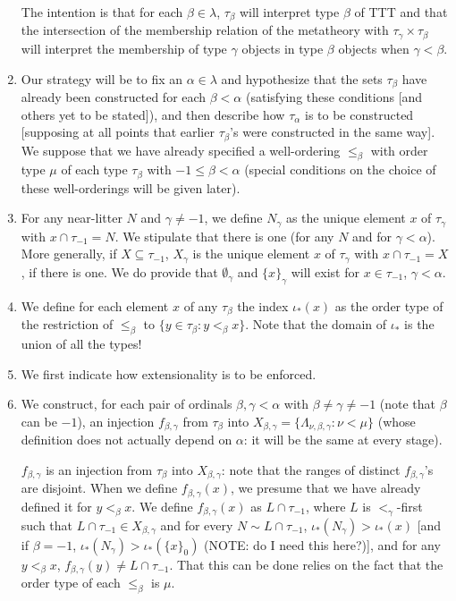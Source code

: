 \documentclass[12pt]{article}
\begin{document}
\begin{enumerate}
The intention is that for each $\beta \in \lambda$, $\tau_\beta$ will interpret type $\beta$ of TTT and that the intersection of the membership relation of the metatheory with $\tau_\gamma \times \tau_\beta$ will interpret the membership of type $\gamma$ objects in type $\beta$ objects when $\gamma<\beta$.

\item Our strategy will be to fix an $\alpha\in \lambda$ and hypothesize that the sets $\tau_\beta$ have already been constructed for each $\beta<\alpha$ (satisfying these conditions [and others yet to be stated]), and then describe how $\tau_\alpha$ is to be constructed [supposing at all points that earlier $\tau_\beta$'s were constructed in the same way].   We suppose that we have already specified
a well-ordering $\leq_\beta$ with order type $\mu$ of each type $\tau_\beta$ with $-1\leq \beta <\alpha$ (special conditions on the choice of these well-orderings will be given later).   

\item For any near-litter $N$ and $\gamma\neq -1$, we define $N_\gamma$ as the unique element $x$  of $\tau_\gamma$ with $x \cap \tau_{-1} = N$.  We stipulate that there is one (for any $N$ and for $\gamma<\alpha$).  More generally, if
$X \subseteq \tau_{-1}$, $X_\gamma$ is the unique element $x$ of $\tau_\gamma$ with $x \cap \tau_{-1} = X$, if there is one.  We do provide that $\emptyset_\gamma$ and $\{x\}_\gamma$ will exist
for $x \in \tau_{-1}$, $\gamma<\alpha$.

\item We define for each element $x$ of any $\tau_\beta$ the index $\iota_*(x)$
as the order type of the restriction of $\leq_\beta$ to $\{y \in \tau_\beta:y <_\beta x\}$.  Note that the domain of $\iota_*$ is the union of all the types!

\item We first indicate how extensionality is to be enforced.  

\item We construct, for each pair of ordinals $\beta,\gamma<\alpha$ with $\beta \neq \gamma\neq -1$ (note that $\beta$ can be $-1$),  an injection $f_{\beta,\gamma}$ from $\tau_\beta$ into $X_{\beta,\gamma} = \{\Lambda_{\nu,\beta,\gamma}:\nu<\mu\}$  (whose definition does not actually depend on $\alpha$:  it will be the same at every stage).

 $f_{\beta,\gamma}$ is an injection from $\tau_\beta$ into $X_{\beta,\gamma}$:  note that the ranges of distinct $f_{\beta,\gamma}$'s are disjoint.
When we define $f_{\beta,\gamma}(x)$, we presume that we have already defined it for $y <_\beta x$.
We define $f_{\beta,\gamma}(x)$ as $L\cap \tau_{-1}$, where $L$ is $<_\gamma$-first such that $L\cap \tau_{-1} \in X_{\beta,\gamma}$ and for every $N \sim L \cap \tau_{-1}$, $\iota_*(N_\gamma)>\iota_*(x)$ [and if $\beta=-1$, $\iota_*(N_\gamma)>\iota_*(\{x\}_0)$ (NOTE:  do I need this here?)], and for any $y<_\beta x$, $f_{\beta,\gamma}(y) \neq L\cap \tau_{-1}$.  That this can be done relies on the fact that the order type of each $\leq_\beta$ is $\mu$.


\end{enumerate}
\end{document}
